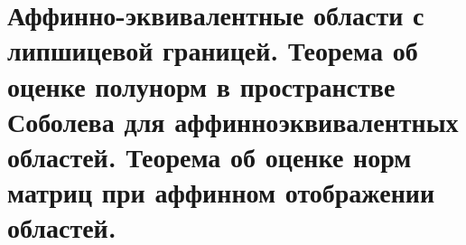\documentclass[__main__.tex]{subfiles}
\begin{document}
\section{Аффинно-эквивалентные области с липшицевой границей. Теорема об оценке полунорм в пространстве Соболева для аффинноэквивалентных областей. Теорема об оценке норм матриц при аффинном отображении областей.}
\end{document}
